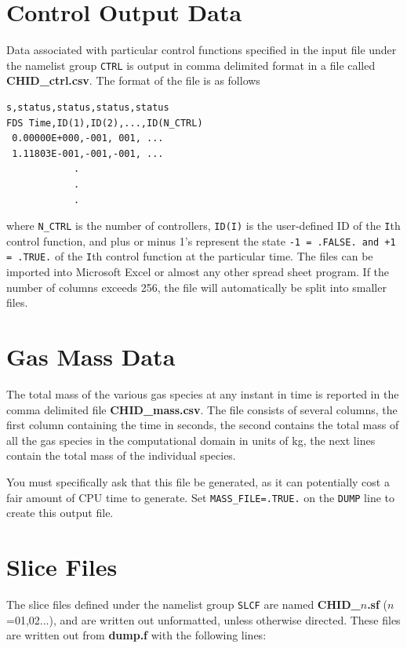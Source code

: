 \documentclass[11pt]{book}
\newcommand{\ct}{\tt\small}
\begin{document}
\section{Control Output Data}
\label{out:CTRL}

Data associated with particular control functions specified in the input file under the
namelist group {\ct CTRL} is output in comma delimited format in a file called
{\bf CHID\_ctrl.csv}. The format of the file is as follows

\footnotesize
\begin{verbatim}
s,status,status,status,status
FDS Time,ID(1),ID(2),...,ID(N_CTRL)
 0.00000E+000,-001, 001, ...
 1.11803E-001,-001,-001, ...
            .
            .
            .

\end{verbatim}
\normalsize

\noindent
where {\ct N\_CTRL} is the number of controllers, {\ct ID(I)} is the user-defined ID of the {\ct I}th control function, and plus or minus 1's represent the
state {\ct -1 = .FALSE. and +1 = .TRUE.} of the {\ct I}th control function at the particular time.
The files can be imported into Microsoft Excel or almost any other
spread sheet program. If the number of columns exceeds 256, the file will automatically be split into smaller files.


\section{Gas Mass Data}

The total mass of the various gas species at any instant in time
is reported in the comma delimited
file {\bf CHID\_mass.csv}. The file consists of several columns,
the first column containing the time in seconds, the second contains the
total mass of all the gas species in the computational domain in units of kg,
the next lines contain the total mass of the individual species.

You must specifically ask that this file be generated, as it can potentially cost a fair amount of CPU time to generate. Set
{\ct MASS\_FILE=.TRUE.} on the {\ct DUMP} line to create this output file.


\section{Slice Files}
\label{out:SLCF}
The slice files defined under the namelist group {\ct SLCF} are
named {\bf CHID\_$n$.sf} ($n$=01,02...),
and are written out unformatted, unless otherwise directed.
These files are written out from {\bf dump.f} with the following lines:
\end{document}
